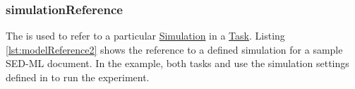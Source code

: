 \subsubsection{simulationReference}
\label{sec:simulationReference}
The  is used to refer to a particular \hyperref[class:simulation]{Simulation} in a \hyperref[class:task]{Task}. 
Listing \ref{lst:modelReference2} shows the reference to a defined simulation for a sample SED-ML document. In the example, both tasks  and  use the simulation settings defined in  to run the experiment.


